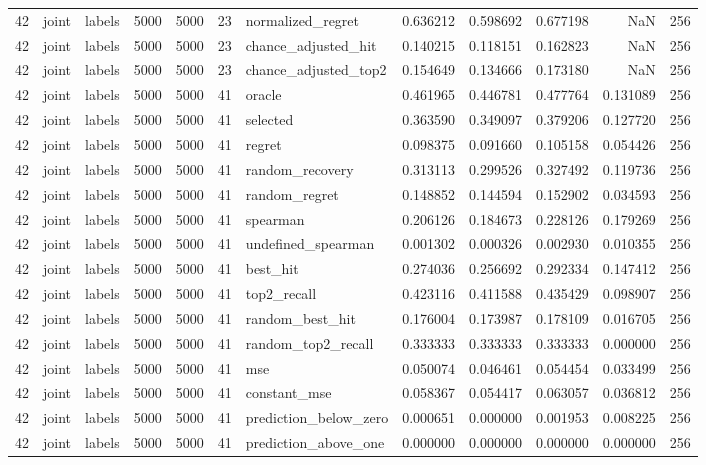 \begin{tabular}{rllrrrlrrrrr}
42 & joint & labels & 5000 & 5000 & 23 & normalized_regret & 0.636212 & 0.598692 & 0.677198 & NaN & 256 \\
42 & joint & labels & 5000 & 5000 & 23 & chance_adjusted_hit & 0.140215 & 0.118151 & 0.162823 & NaN & 256 \\
42 & joint & labels & 5000 & 5000 & 23 & chance_adjusted_top2 & 0.154649 & 0.134666 & 0.173180 & NaN & 256 \\
42 & joint & labels & 5000 & 5000 & 41 & oracle & 0.461965 & 0.446781 & 0.477764 & 0.131089 & 256 \\
42 & joint & labels & 5000 & 5000 & 41 & selected & 0.363590 & 0.349097 & 0.379206 & 0.127720 & 256 \\
42 & joint & labels & 5000 & 5000 & 41 & regret & 0.098375 & 0.091660 & 0.105158 & 0.054426 & 256 \\
42 & joint & labels & 5000 & 5000 & 41 & random_recovery & 0.313113 & 0.299526 & 0.327492 & 0.119736 & 256 \\
42 & joint & labels & 5000 & 5000 & 41 & random_regret & 0.148852 & 0.144594 & 0.152902 & 0.034593 & 256 \\
42 & joint & labels & 5000 & 5000 & 41 & spearman & 0.206126 & 0.184673 & 0.228126 & 0.179269 & 256 \\
42 & joint & labels & 5000 & 5000 & 41 & undefined_spearman & 0.001302 & 0.000326 & 0.002930 & 0.010355 & 256 \\
42 & joint & labels & 5000 & 5000 & 41 & best_hit & 0.274036 & 0.256692 & 0.292334 & 0.147412 & 256 \\
42 & joint & labels & 5000 & 5000 & 41 & top2_recall & 0.423116 & 0.411588 & 0.435429 & 0.098907 & 256 \\
42 & joint & labels & 5000 & 5000 & 41 & random_best_hit & 0.176004 & 0.173987 & 0.178109 & 0.016705 & 256 \\
42 & joint & labels & 5000 & 5000 & 41 & random_top2_recall & 0.333333 & 0.333333 & 0.333333 & 0.000000 & 256 \\
42 & joint & labels & 5000 & 5000 & 41 & mse & 0.050074 & 0.046461 & 0.054454 & 0.033499 & 256 \\
42 & joint & labels & 5000 & 5000 & 41 & constant_mse & 0.058367 & 0.054417 & 0.063057 & 0.036812 & 256 \\
42 & joint & labels & 5000 & 5000 & 41 & prediction_below_zero & 0.000651 & 0.000000 & 0.001953 & 0.008225 & 256 \\
42 & joint & labels & 5000 & 5000 & 41 & prediction_above_one & 0.000000 & 0.000000 & 0.000000 & 0.000000 & 256 \\

\end{tabular}
